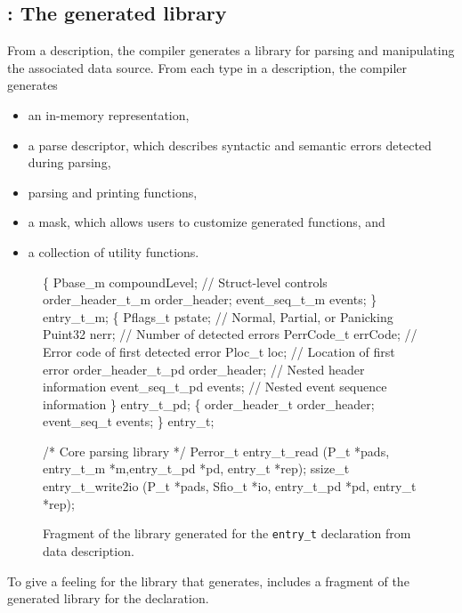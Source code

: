 \subsection{\pads{}: The generated library}
From a description, the \pads{} compiler generates a \C{} library
for parsing and manipulating the associated data source.  
From each type in a \pads{} description, the compiler generates 
\begin{itemize}
\setlength{\itemsep}{0ex plus0.2ex}
\item an in-memory representation, 
\item a parse descriptor, which describes syntactic and semantic errors detected during parsing, 
\item parsing and printing functions, 
\item a mask, which allows users to customize generated functions, and
\item a collection of utility functions.
\end{itemize}
%
\setcounter{totalnumber}{1}
\setcounter{dbltopnumber}{1}
\renewcommand{\topfraction}{0.85}
\renewcommand{\textfraction}{0.1}
\renewcommand{\floatpagefraction}{0.75}
\begin{figure*}
\begin{tiny}
\begin{code}
  \{
  Pbase\_m            compoundLevel;   // Struct-level controls
  order\_header\_t\_m   order\_header;
  event\_seq\_t\_m      events;
\} entry\_t\_m;
\mbox{}
  \{
  Pflags\_t   pstate;       // Normal, Partial, or Panicking 
  Puint32    nerr;         // Number of detected errors
  PerrCode\_t errCode;      // Error code of first detected error
  Ploc\_t     loc;          // Location of first error
  order\_header\_t\_pd order\_header;     // Nested header information
  event\_seq\_t\_pd    events; // Nested event sequence information
\} entry\_t\_pd;
\mbox{}
  \{
  order\_header\_t order\_header;
  event\_seq\_t    events;
\} entry\_t;
\end{code}
\begin{code}
/* Core parsing library */
Perror\_t entry\_t\_read     (P\_t *pads, entry\_t\_m *m,entry\_t\_pd *pd, entry\_t *rep);
ssize\_t  entry\_t\_write2io (P\_t *pads, Sfio\_t *io,   entry\_t\_pd *pd, entry\_t *rep);
\end{code}
\caption{Fragment of the library generated for the \texttt{entry\_t}
  declaration from \dibbler{} data description.}
\label{figure:library}
\end{tiny}
\end{figure*}
To give a feeling for the library that \pads{} generates, 
 includes a fragment of the generated 
library for the \dibbler{}  declaration.

